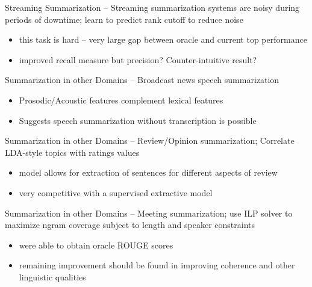 \documentclass{beamer}
\begin{document}
\begin{frame}{Streaming Summarization}
\cite{mccreadie2014incremental} -- Streaming summarization systems are noisy
    during periods of downtime; learn to predict rank cutoff to reduce noise
\begin{itemize}
\item this task is hard -- very large gap between oracle and current top 
    performance
\item improved recall measure but precision? Counter-intuitive result? 
\end{itemize}
\end{frame}

\begin{frame}{Summarization in other Domains}
\cite{maskey2005comparing} -- Broadcast news speech summarization
\begin{itemize}
\item Prosodic/Acoustic features complement lexical features
\item Suggests speech summarization without transcription is possible
\end{itemize}
\end{frame}

\begin{frame}{Summarization in other Domains}
\cite{titov2008joint} -- Review/Opinion summarization; Correlate LDA-style 
    topics with ratings values
\begin{itemize}
\item model allows for extraction of sentences for different aspects of review
\item very competitive with a supervised extractive model 
\end{itemize}
 
\end{frame}


\begin{frame}{Summarization in other Domains}
\cite{gillick2009global} -- Meeting summarization; use ILP solver to maximize
    ngram coverage subject to length and speaker constraints
\begin{itemize}
\item were able to obtain oracle ROUGE scores
\item remaining improvement should be found in improving coherence and other
    linguistic qualities 
\end{itemize}
\end{frame}
\end{document}
